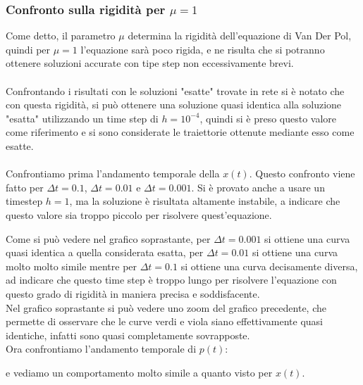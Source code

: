 \documentclass[12pt]{article}
\begin{document}
\subsubsection{Confronto sulla rigidità per $\mu = 1$}
Come detto, il parametro $\mu$ determina la rigidità dell'equazione di Van Der Pol, quindi per $\mu = 1$ l'equazione sarà poco rigida, e ne risulta che si potranno ottenere soluzioni accurate con tipe step non eccessivamente brevi. \\ \\
Confrontando i risultati con le soluzioni "esatte" trovate in rete si è notato che con questa rigidità, si può ottenere una soluzione quasi identica alla soluzione "esatta" utilizzando un time step di $h = 10^{-4}$, quindi si è preso questo valore come riferimento e si sono considerate le traiettorie ottenute mediante esso come esatte. \\ \\
Confrontiamo prima l'andamento temporale della $x(t)$. Questo confronto viene fatto per $\Delta t = 0.1$, $\Delta t = 0.01$ e $\Delta t = 0.001$. Si è provato anche a usare un timestep $h=1$, ma la soluzione è risultata altamente instabile, a indicare che questo valore sia troppo piccolo per risolvere quest'equazione. 
\begin{figure}[H]
	\centering
	\scalebox{0.9}{}
\end{figure}
\begin{figure}[H]
	\centering
	
\end{figure}
Come si può vedere nel grafico soprastante, per $\Delta t = 0.001$ si ottiene una curva quasi identica a quella considerata esatta, per $\Delta t = 0.01$ si ottiene una curva molto molto simile mentre per $\Delta t = 0.1$ si ottiene una curva decisamente diversa, ad indicare che questo time step è troppo lungo per risolvere l'equazione con questo grado di rigidità in maniera precisa e soddisfacente. \\
Nel grafico soprastante si può vedere uno zoom del grafico precedente, che permette di osservare che le curve verdi e viola siano effettivamente quasi identiche, infatti sono quasi completamente sovrapposte. \\
Ora confrontiamo l'andamento temporale di $p(t)$: 
\begin{figure}[H]
	\centering
	
\end{figure}
e vediamo un comportamento molto simile a quanto visto per $x(t)$. 
\begin{figure}[H]
	\centering
	
\end{figure}
\end{document}
